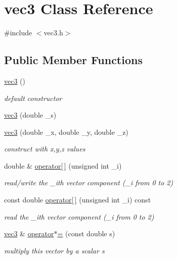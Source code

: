 \hypertarget{classvec3}{}\section{vec3 Class Reference}
\label{classvec3}


{\ttfamily \#include $<$vec3.\+h$>$}

\subsection*{Public Member Functions}
\begin{DoxyCompactItemize}
\item 
\hyperlink{classvec3_aea9f3480a6ccd7ce3ab02d0992705d33}{vec3} ()
\begin{DoxyCompactList}\small\item\em default constructor \end{DoxyCompactList}\item 
\hyperlink{classvec3_a9d6f187ab027ca950abcdb723b69466e}{vec3} (double \+\_\+s)
\item 
\hyperlink{classvec3_ae1737945802bd8be9574b51a0ff04c0d}{vec3} (double \+\_\+x, double \+\_\+y, double \+\_\+z)
\begin{DoxyCompactList}\small\item\em construct with x,y,z values \end{DoxyCompactList}\item 
double \& \hyperlink{classvec3_a7d8b0448cae3b86cc008aede26be5824}{operator\mbox{[}$\,$\mbox{]}} (unsigned int \+\_\+i)
\begin{DoxyCompactList}\small\item\em read/write the \+\_\+i\textquotesingle{}th vector component (\+\_\+i from 0 to 2) \end{DoxyCompactList}\item 
const double \hyperlink{classvec3_a6c1857293ebc424a97d517a217aec037}{operator\mbox{[}$\,$\mbox{]}} (unsigned int \+\_\+i) const 
\begin{DoxyCompactList}\small\item\em read the \+\_\+i\textquotesingle{}th vector component (\+\_\+i from 0 to 2) \end{DoxyCompactList}\item 
\hyperlink{classvec3}{vec3} \& \hyperlink{classvec3_ab3799a04d6028ec6cc26e4d822fb3480}{operator$\ast$=} (const double s)
\begin{DoxyCompactList}\small\item\em multiply this vector by a scalar {\ttfamily s} \end{DoxyCompactList}\item 

\end{DoxyCompactItemize}
